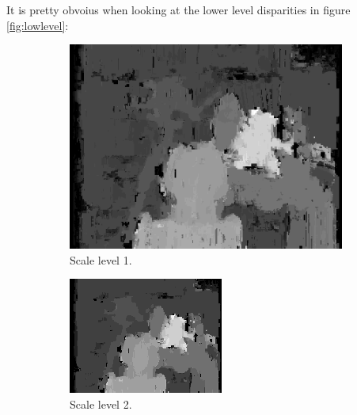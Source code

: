 \documentclass[12pt,a4paper,oneside,final]{article}
\begin{document}
	{\color{red} It is pretty obvoius when looking at the lower level disparities in figure \ref{fig:lowlevel}:
		\begin{figure}[H]
			\centering
			\begin{subfigure}[b]{0.24\textwidth}
				\includegraphics[width=\textwidth]{disparity1set_1.png}
				\caption{Scale level 1.}
			\end{subfigure}
			\begin{subfigure}[b]{0.24\textwidth}
				\includegraphics[width=\textwidth]{disparity2set_1.png}
				\caption{Scale level 2.}
			\end{subfigure}
			\begin{subfigure}[b]{0.24\textwidth}

\end{subfigure}
\end{figure}}
\end{document}
